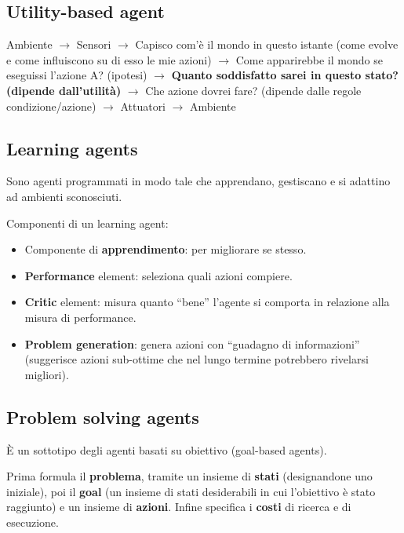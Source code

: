 \subsection{Utility-based agent}

Ambiente $\rightarrow$ Sensori $\rightarrow$ Capisco com'è il mondo in questo
istante (come evolve e come influiscono su di esso le mie azioni)
$\rightarrow$ Come apparirebbe il mondo se eseguissi l'azione A? (ipotesi)
$\rightarrow$ \textbf{Quanto soddisfatto sarei in questo stato?
(dipende dall'utilità)} $\rightarrow$ Che azione dovrei fare?
(dipende dalle regole condizione/azione) $\rightarrow$ Attuatori
$\rightarrow$ Ambiente

\subsection{Learning agents}

Sono agenti programmati in modo tale che apprendano, gestiscano e si adattino
ad ambienti sconosciuti.

Componenti di un learning agent:

\begin{itemize}
 \item Componente di \textbf{apprendimento}: per migliorare se stesso.
 \item \textbf{Performance} element: seleziona quali azioni compiere.
 \item \textbf{Critic} element: misura quanto ``bene'' l'agente si
comporta in relazione alla misura di performance.
 \item \textbf{Problem generation}: genera azioni con ``guadagno di
informazioni'' (suggerisce azioni sub-ottime che nel lungo
termine potrebbero rivelarsi migliori).
\end{itemize}

\subsection{Problem solving agents}

È un sottotipo degli agenti basati su obiettivo (goal-based agents).

Prima formula il \textbf{problema}, tramite un insieme di \textbf{stati}
(designandone uno iniziale), poi il \textbf{goal} (un insieme di stati
desiderabili in cui l'obiettivo è stato raggiunto) e un insieme di
\textbf{azioni}.
Infine specifica i \textbf{costi} di ricerca e di esecuzione. \\

